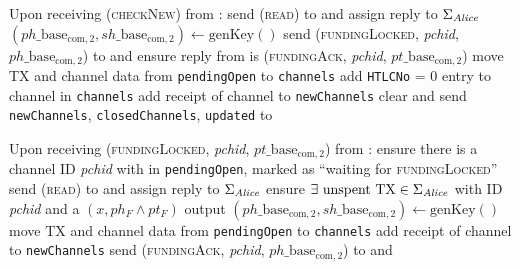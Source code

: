\begin{algorithmic}[1]
    \State {}
    \State Upon receiving (\textsc{checkNew}) from \environment:
    \Indent
      \State send (\textsc{read}) to \ledger{} and assign reply to
      $\Sigma_{\mathit{Alice}}$
        \State $\left(ph\_\mathrm{base}_{\mathrm{com}, 2},
        sh\_\mathrm{base}_{\mathrm{com}, 2}\right) \gets
        \mathrm{genKey}\left(\right)$
        \State send (\textsc{fundingLocked}, \textit{pchid},
        $ph\_\mathrm{base}_{\mathrm{com}, 2}$) to \bob{}  and
        ensure reply from \bob{} is (\textsc{fundingAck}, \textit{pchid},
        $pt\_\mathrm{base}_{\mathrm{com}, 2}$)
        \State move TX and channel data from \texttt{pendingOpen} to
        \texttt{channels}
        \State add \texttt{HTLCNo} = 0 entry to channel in \texttt{channels}
        \State add receipt of channel to \texttt{newChannels}
      \EndFor
      \State clear and send \texttt{newChannels}, \texttt{closedChannels},
      \texttt{updated} to \environment
    \EndIndent
    \State

    \State Upon receiving (\textsc{fundingLocked}, \textit{pchid},
    $pt\_\mathrm{base}_{\mathrm{com}, 2}$) from \bob:
    \Indent
      \State ensure there is a channel ID \textit{pchid} with \bob{} in
      \texttt{pendingOpen}, marked as ``waiting for \textsc{fundingLocked}''
      \State send (\textsc{read}) to \ledger{} and assign reply to
      $\Sigma_{\mathit{Alice}}$
      \State ensure $\exists \text{ unspent } \mathrm{TX} \in \Sigma_{\mathit{Alice}}$
      with ID \textit{pchid} and a $\left(x, ph_F \wedge pt_F\right)$ output
      \State $\left(ph\_\mathrm{base}_{\mathrm{com}, 2},
      sh\_\mathrm{base}_{\mathrm{com}, 2}\right) \gets
      \mathrm{genKey}\left(\right)$
      \State move TX and channel data from \texttt{pendingOpen} to
      \texttt{channels}
      \State add receipt of channel to \texttt{newChannels}
      \State send (\textsc{fundingAck}, \textit{pchid},
      $ph\_\mathrm{base}_{\mathrm{com}, 2}$) to \bob{} and \adversary
    \EndIndent
    \State


\end{algorithmic}
